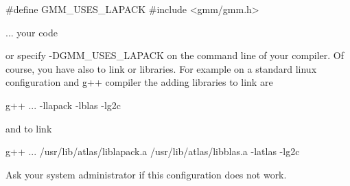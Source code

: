 \documentclass[11pt,a4paper]{article}
\begin{document}
\begin{cppcode}
  \#define GMM_USES_LAPACK
  \#include <gmm/gmm.h>

  ... your code
\end{cppcode}

or specify -DGMM_USES_LAPACK on the command line of your compiler. Of course, you have also to link  or  libraries. For example on a standard linux configuration and g++ compiler the adding libraries to link  are
\begin{cppcode}
  g++ ...  -llapack -lblas -lg2c
\end{cppcode}
and to link  
\begin{cppcode}
  g++ ... /usr/lib/atlas/liblapack.a /usr/lib/atlas/libblas.a -latlas -lg2c
\end{cppcode}

Ask your system administrator if this configuration does not work.
\end{document}
